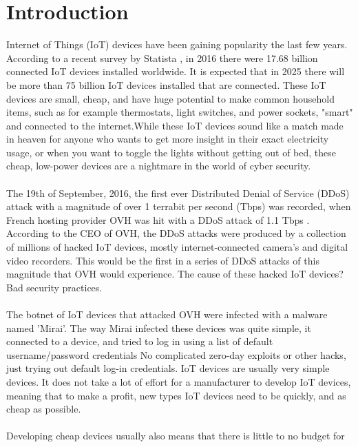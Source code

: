 \documentclass[a4paper,10pt]{article}
\begin{document}
\section{Introduction} \label{sec:introduction}
Internet of Things (IoT) devices have been gaining popularity the last few years. According to a recent survey by Statista 
\cite{amount_iot_devices}, in 2016 there were 17.68 billion connected IoT devices installed worldwide. It is expected that in 2025 
there will be more than 75 billion IoT devices installed that are connected. These IoT devices are small, cheap, and have
huge potential to make common household items, such as for example thermostats, light switches, and power sockets, 
"smart" and connected to the internet.While these IoT devices sound like a match made in heaven for anyone who wants to get more insight in their exact 
electricity usage, or when you want to toggle the lights without getting out of bed, these cheap, low-power devices  are 
a nightmare in the world of cyber security.
\\\\
The 19th of September, 2016, the first ever Distributed Denial of Service (DDoS) attack with a magnitude of over 1 terrabit
per second (Tbps) was recorded, when French hosting provider OVH was hit with a DDoS attack of 1.1 Tbps \cite{ovh}. 
According to the CEO of OVH, the DDoS attacks were produced by a collection of millions of hacked IoT devices, mostly
internet-connected camera's and digital video recorders. This would be the first in a series of DDoS attacks of this 
magnitude that OVH would experience. The cause of these hacked IoT devices? Bad security practices.
\\\\
The botnet of IoT devices that attacked OVH were infected with a malware named 'Mirai'. The way Mirai infected these
devices was quite simple, it connected to a device, and tried to log in using a list of default username/password credentials
\cite{how_mirai_works} No complicated zero-day exploits or other hacks, just trying out default log-in credentials. IoT 
devices are usually very  simple devices. It does not take a lot of effort for a manufacturer to develop IoT devices, 
meaning that to make a profit, new types IoT devices need to be quickly, and as cheap as possible. 
\\\\
Developing cheap devices usually also  means that there is little to no budget for 
\end{document}
